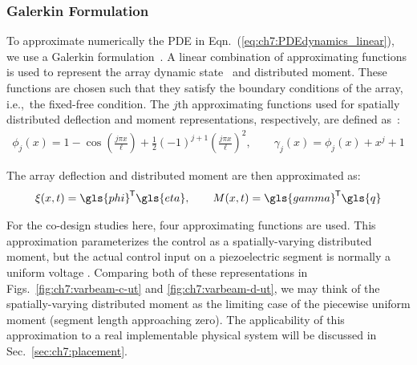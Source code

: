 

\subsubsection{Galerkin Formulation}

To approximate numerically the PDE in Eqn.~(\ref{eq:ch7:PDEdynamics_linear}), we use a Galerkin formulation~\cite{Junkins1993a, Paranjape2012a, Paranjape2013a}. A linear combination of approximating functions is used to represent the array dynamic state~\cite{Junkins1993a} and distributed moment. These functions are chosen such that they satisfy the boundary conditions of the array, i.e.,~the fixed-free condition. The $j$th approximating functions used for spatially distributed deflection and moment representations, respectively, are defined as~\cite{Junkins1993a}:
\begin{align}
\phi_{j}(x) = 1- \cos \left(\frac{j \pi x}{\ell} \right) +\frac{1}{2}(-1)^{j+1} \left(\frac{j \pi x}{\ell} \right)^{2}, \qquad 
\gamma_{j} (x) = \phi_{j}(x)+x^{j}+1 \label{eq:ch7:modes}
\end{align}

\noindent The array deflection and distributed moment are then approximated as:
\begin{align}
\xi(x,t) = \gls{phi}\tran \gls{eta}, \qquad M(x,t) = \gls{gamma}\tran \gls{q}
\end{align}

\noindent For the co-design studies here, four approximating functions are used. This approximation parameterizes the control as a spatially-varying distributed moment, but the actual control input on a piezoelectric segment is normally a uniform voltage \cite{Moheimani2006a}. Comparing both of these representations in Figs.~\ref{fig:ch7:varbeam-c-ut} and \ref{fig:ch7:varbeam-d-ut}, we may think of the spatially-varying distributed moment as the limiting case of the piecewise uniform moment (segment length approaching zero). The applicability of this approximation to a real implementable physical system will be discussed in Sec.~\ref{sec:ch7:placement}.

